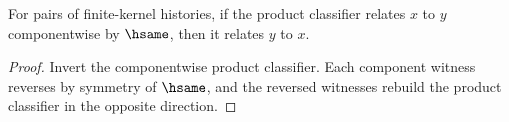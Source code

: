 \begin{theorem}
\label{thm:prod-classifier-hsame-symm}
For pairs of finite-kernel histories, if the product classifier relates \(x\)
to \(y\) componentwise by \(\hsame\), then it relates \(y\) to \(x\).
\end{theorem}
\begin{proof}
Invert the componentwise product classifier. Each component witness reverses by
symmetry of \(\hsame\), and the reversed witnesses rebuild the product
classifier in the opposite direction.
\end{proof}
